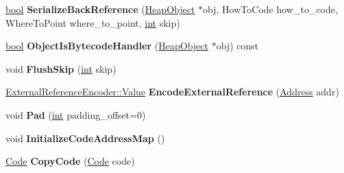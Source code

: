 \begin{DoxyCompactItemize}
\item 
\mbox{\label{classv8_1_1internal_1_1Serializer_a5d04f4c778e3f2c126bdd4832375bbba}} 
\mbox{\hyperlink{classbool}{bool}} {\bfseries Serialize\+Back\+Reference} (\mbox{\hyperlink{classv8_1_1internal_1_1HeapObject}{Heap\+Object}} $\ast$obj, How\+To\+Code how\+\_\+to\+\_\+code, Where\+To\+Point where\+\_\+to\+\_\+point, \mbox{\hyperlink{classint}{int}} skip)
\item 
\mbox{\label{classv8_1_1internal_1_1Serializer_a6af39a7db0acbb54143a8ac51ed65d67}} 
\mbox{\hyperlink{classbool}{bool}} {\bfseries Object\+Is\+Bytecode\+Handler} (\mbox{\hyperlink{classv8_1_1internal_1_1HeapObject}{Heap\+Object}} $\ast$obj) const
\item 
\mbox{\label{classv8_1_1internal_1_1Serializer_a7e2eb2286a158742af313150f62b1b7a}} 
void {\bfseries Flush\+Skip} (\mbox{\hyperlink{classint}{int}} skip)
\item 
\mbox{\label{classv8_1_1internal_1_1Serializer_a1b2b87d06484b99484378e1fcbfed6a8}} 
\mbox{\hyperlink{classv8_1_1internal_1_1ExternalReferenceEncoder_1_1Value}{External\+Reference\+Encoder\+::\+Value}} {\bfseries Encode\+External\+Reference} (\mbox{\hyperlink{classuintptr__t}{Address}} addr)
\item 
\mbox{\label{classv8_1_1internal_1_1Serializer_ab5a0fb29fbf0f1c4db6044eafd5d5b97}} 
void {\bfseries Pad} (\mbox{\hyperlink{classint}{int}} padding\+\_\+offset=0)
\item 
\mbox{\label{classv8_1_1internal_1_1Serializer_a02df94cb146e256696d93d0062282d28}} 
void {\bfseries Initialize\+Code\+Address\+Map} ()
\item 
\mbox{\label{classv8_1_1internal_1_1Serializer_a9997e25c7520d3d61923df799dd8652b}} 
\mbox{\hyperlink{classv8_1_1internal_1_1Code}{Code}} {\bfseries Copy\+Code} (\mbox{\hyperlink{classv8_1_1internal_1_1Code}{Code}} code)
\item 
\mbox{\label{classv8_1_1internal_1_1Serializer_a75fd7fb8eaacf0ce9874137e56d0e887}} 

\end{DoxyCompactItemize}
